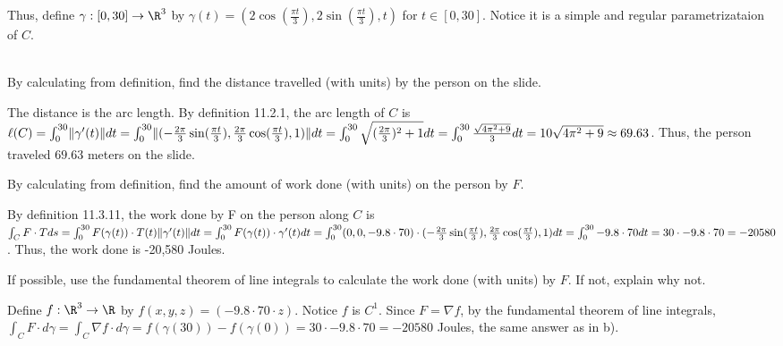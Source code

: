 \documentclass{exam}
\DeclarePairedDelimiter\norm{\lVert}{\rVert} %
\begin{document}
\begin{questions}
\begin{parts}
\begin{answer}{200pt}
Thus, define $\gamma: [0, 30] \to \R^3$ by $\gamma(t) = (2\cos(\frac{\pi t}{3}), 2\sin(\frac{\pi t}{3}), t)$ for $t \in [0, 30]$. Notice it is a simple and regular parametrizataion of $C$.\\\\
\end{answer}

\item By calculating from definition, find the distance travelled (with units) by the person on the slide.  

\begin{answer}{300pt}
The distance is the arc length. By definition 11.2.1, the arc length of $C$ is $\ell(C) = \int_{0}^{30}\norm{\gamma'(t)}dt = \int_{0}^{30}\norm{(-\frac{2\pi}{3}\sin(\frac{\pi t}{3}), \frac{2\pi}{3}\cos(\frac{\pi t}{3}), 1)}dt = \int_{0}^{30} \sqrt{(\frac{2\pi}{3})^2 + 1}dt = \int_{0}^{30} \frac{\sqrt{4\pi^2 + 9}}{3}dt = 10\sqrt{4\pi^2 + 9} \approx 69.63$. Thus, the person traveled $69.63$ meters on the slide.
\end{answer}


\item By calculating from definition, find the amount of work done (with units) on the person by $F$.
\begin{answer}{320pt}
By definition 11.3.11, the work done by F on the person along $C$ is $\int_C F \cdot T ds = \int_0^{30} F(\gamma(t)) \cdot T(t) \norm{\gamma'(t)}dt = \int_0^{30} F(\gamma(t)) \cdot \gamma'(t)dt = \int_0^{30} (0,0,-9.8 \cdot 70) \cdot (-\frac{2\pi}{3}\sin(\frac{\pi t}{3}), \frac{2\pi}{3}\cos(\frac{\pi t}{3}), 1) dt = \int_0^{30} -9.8 \cdot 70 dt = 30 \cdot -9.8 \cdot 70 = -20580$. Thus, the work done is -20,580 Joules.
\end{answer}

\item If possible, use the fundamental theorem of line integrals to calculate the work done (with units) by $F$. If not, explain why not. 

\begin{answer}{250pt}
Define $f: \R^3 \to \R$ by $f(x,y,z) = (-9.8\cdot70\cdot z)$. Notice $f$ is $C^1$. Since $F = \nabla f$, by the fundamental theorem of line integrals, $\int_C F \cdot d\gamma = \int_C \nabla f \cdot d\gamma = f(\gamma(30)) - f(\gamma(0)) = 30 \cdot -9.8 \cdot 70 = -20580$ Joules, the same answer as in b).
\end{answer}




\end{parts}
\end{questions}
\end{document}
